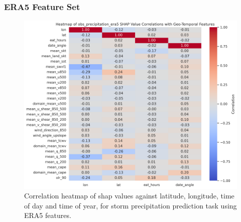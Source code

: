 \subsubsection{ERA5 Feature Set}
\begin{figure}[ht]
    \centering
    \includegraphics[width=\textwidth]{../figures/generated/experiments/obs_precipitation/obs_precipitation_era5_shap_correlation_heatmap.png}
    \caption{Correlation heatmap of \acrshort{shap} values against latitude, longitude, time of day and time of year, for storm precipitation prediction task using ERA5 features.}
    \label{fig:obs_precipitation_era5_shap_heatmap}
\end{figure}